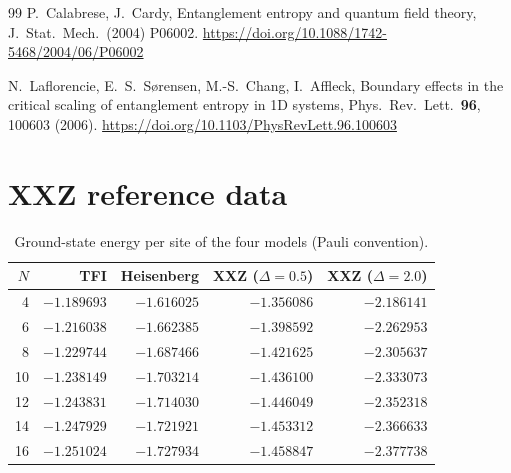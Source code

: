 \documentclass[pdflatex,sn-mathphys-num]{sn-jnl}
\begin{document}
\begin{thebibliography}{99}
P.~Calabrese, J.~Cardy, Entanglement entropy and quantum field
theory, J.\ Stat.\ Mech.\ (2004) P06002.
\href{https://doi.org/10.1088/1742-5468/2004/06/P06002}{https://doi.org/10.1088/1742-5468/2004/06/P06002}

N.~Laflorencie, E.~S.~S{\o}rensen, M.-S.~Chang, I.~Affleck, Boundary
effects in the critical scaling of entanglement entropy in 1D
systems, Phys.\ Rev.\ Lett.\ \textbf{96}, 100603 (2006).
\href{https://doi.org/10.1103/PhysRevLett.96.100603}{https://doi.org/10.1103/PhysRevLett.96.100603}

\end{thebibliography}

\appendix

\section{XXZ reference data}
\label{app:xxz}

\begin{table}[t]
\centering
\small
\caption{Ground-state energy per site of the four models (Pauli
convention).}
\label{tab:xxz}
\begin{tabular}{rrrrr}
\toprule
$N$ & TFI & Heisenberg & XXZ ($\Delta=0.5$) & XXZ ($\Delta=2.0$) \\
\midrule
4  & $-1.189693$ & $-1.616025$ & $-1.356086$ & $-2.186141$ \\
6  & $-1.216038$ & $-1.662385$ & $-1.398592$ & $-2.262953$ \\
8  & $-1.229744$ & $-1.687466$ & $-1.421625$ & $-2.305637$ \\
10 & $-1.238149$ & $-1.703214$ & $-1.436100$ & $-2.333073$ \\
12 & $-1.243831$ & $-1.714030$ & $-1.446049$ & $-2.352318$ \\
14 & $-1.247929$ & $-1.721921$ & $-1.453312$ & $-2.366633$ \\
16 & $-1.251024$ & $-1.727934$ & $-1.458847$ & $-2.377738$ \\
\bottomrule
\end{tabular}
\end{table}
\end{document}
